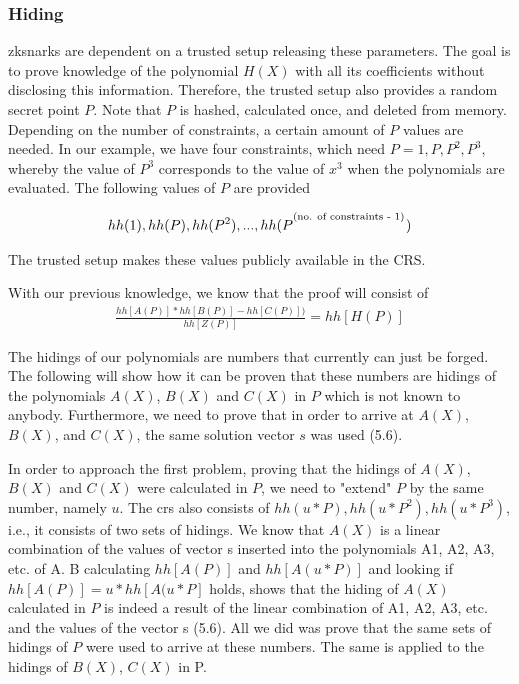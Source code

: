 \subsubsection{Hiding}
\acrshort{zksnark}s are dependent on a trusted setup releasing these parameters. The goal is to prove knowledge of the polynomial \(H(X)\) with all its coefficients without disclosing this information. Therefore, the trusted setup also provides a random secret point \(P\). Note that \(P\) is hashed, calculated once, and deleted from memory. Depending on the number of constraints, a certain amount of \(P\) values are needed. In our example, we have four constraints, which need \(P = {1, P, P^2, P^3}\), whereby the value of \(P^3\) corresponds to the value of \(x^3\) when the polynomials are evaluated. The following values of \(P\) are provided

\begin{align}
    hh(1), hh(P), hh(P^2), ..., hh(P^\textsuperscript{(no. of constraints - 1)})
\end{align}

The trusted setup makes these values publicly available in the CRS.

With our previous knowledge, we know that the proof will consist of
\begin{align}
    \frac{hh[A(P)] * hh[B(P)] - hh[C(P)])}{hh[Z(P)]} = hh[H(P)]
\end{align}

The hidings of our polynomials are numbers that currently can just be forged. The following will show how it can be proven that these numbers are hidings of the polynomials \(A(X)\), \(B(X)\) and \(C(X)\) in \(P\) which is not known to anybody. Furthermore, we need to prove that in order to arrive at \(A(X)\), \(B(X)\), and \(C(X)\), the same solution vector \(s\) was used (5.6). 

In order to approach the first problem, proving that the hidings of \(A(X)\),  \(B(X)\) and \(C(X)\) were calculated in \(P\), we need to "extend" \(P\) by the same number, namely \(u\). The \acrshort{crs} also consists of \(hh(u*P), hh(u*P^2), hh(u*P^3)\), i.e., it consists of two sets of hidings. We know that \(A(X)\) is a linear combination of the values of vector s inserted into the polynomials A1, A2, A3, etc. of A. B calculating \(hh[A(P)]\) and \(hh[A(u*P)]\) and looking if \(hh[A(P)] = u * hh[A(u*P]\) holds, shows that the hiding of \(A(X)\) calculated in \(P\) is indeed a result of the linear combination of A1, A2, A3, etc. and the values of the vector s (5.6). All we did was prove that the same sets of hidings of \(P\) were used to arrive at these numbers. The same is applied to the hidings of \(B(X)\), \(C(X)\) in P.

